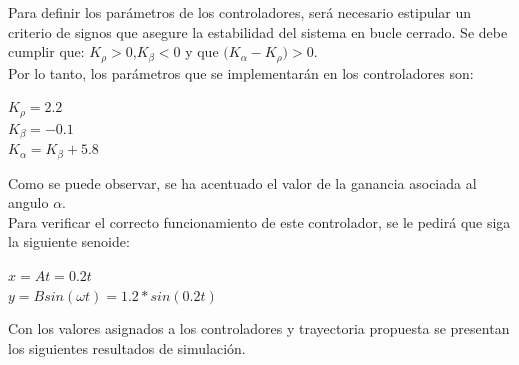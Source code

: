 \documentclass[a4paper,twoside]{article}
\begin{document}
Para definir los parámetros de los controladores, será necesario estipular un criterio de signos que asegure la estabilidad del sistema en bucle cerrado. Se debe cumplir que: $K_{\rho}>0$,$K_{\beta}<0$ y que $\Big(K_{\alpha}-K_{\rho}\Big)>0$.\\
Por lo tanto, los parámetros que se implementarán en los controladores son:
\begin{center}
$K_{\rho}=2.2$\\
$K_{\beta}=-0.1$\\
$K_{\alpha}=K_{\beta}+5.8$
\end{center}
Como se puede observar, se ha acentuado el valor de la ganancia asociada al angulo $\alpha$. \\

Para verificar el correcto funcionamiento de este controlador, se le pedirá que siga la siguiente senoide:
\begin{center}
$x=At=0.2t$\\
$y=Bsin(\omega t)=1.2*sin(0.2t)$
\end{center}

Con los valores asignados a los controladores y trayectoria propuesta se presentan los siguientes
	resultados de simulación.\\ 
\end{document}
